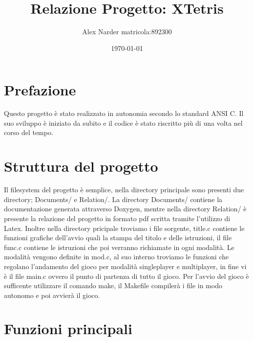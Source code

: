 \documentclass[12pt, letterpaper]{article}
\title{Relazione Progetto: XTetris}
\author{Alex Narder matricola:892300}
\date{\today}
\begin{document}
\maketitle

\section{Prefazione}

Questo progetto è stato realizzato in autonomia secondo lo standard ANSI C.
Il suo sviluppo è iniziato da subito e il codice è stato riscritto più di una volta nel 
corso del tempo.

\section{Struttura del progetto}

Il filesystem del progetto è semplice, nella directory principale sono presenti due directory;
Documents/ e Relation/. La directory Documents/ contiene la documentazione generata attraverso 
Doxygen, mentre nella directory Relation/ è presente la relazione del progetto in formato pdf scritta
tramite l'utilizzo di Latex. Inoltre nella directory pricipale troviamo i file sorgente, title.c contiene 
le funzioni grafiche dell'avvio quali la stampa del titolo e delle istruzioni, il file func.c contiene le 
istruzioni che poi verranno richiamate in ogni modalità. Le modalità vengono definite in mod.c,
al suo interno troviamo le funzioni che regolano l'andamento del gioco per modalità singleplayer e 
multiplayer, in fine vi è il file main.c ovvero il punto di partenza di tutto il gioco.
\newline
Per l'avvio del gioco è sufficente utilizzare il comando make, il Makefile compilerà i file 
in modo autonomo e poi avvierà il gioco.

\section{Funzioni principali}
\end{document}

